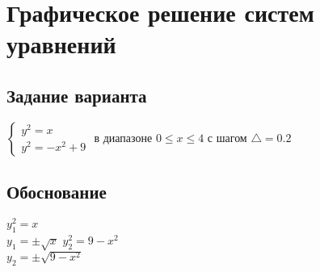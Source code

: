 \documentclass[a4paper, 12pt, oneside]{article}
\begin{document}
    \section{Графическое решение систем уравнений}

    \subsection{Задание варианта}
    $\begin{cases}
         y^2 = x\\
         y^2 = -x^2 + 9
    \end{cases}$
    в диапазоне $0 \leq x \leq 4$ с шагом $\triangle = 0.2$

    \subsection{Обоснование}
    $y_1^2 = x$\\
    $y_1 = \pm\sqrt{x}$\bigbreak
    $y_2^2=9-x^2$\\
    $y_2=\pm\sqrt{9-x^2}$
\end{document}
